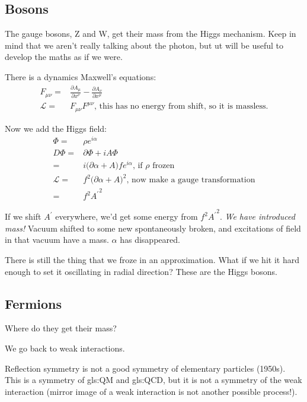\documentclass[]{article}
\begin{document}
\subsection{Bosons}

The gauge bosons, Z and W, get their mass from the Higgs mechanism. Keep in mind that we aren't really talking about the photon, but ut will be useful to develop the maths as if we were.

There is a dynamics Maxwell's equations:
\begin{align*}
	F_{\mu\nu}=&\frac{\partial A_\mu}{\partial x^\nu}-\frac{\partial A_\nu}{\partial x^\mu}\\
	\mathcal{L} =& F_{\mu\nu} F^{\mu\nu} \text{, this has no energy from shift, so it is massless.}
\end{align*}

Now we add the Higgs field:
\begin{align*}
	\Phi =& \rho e^{i \alpha}\\
	D \Phi =& \partial \Phi + i A \Phi\\
	=& i \big( \partial \alpha + A \big) f e^{i \alpha} \text{, if $\rho$ frozen}\\
	\mathcal{L} =& f^2 \big(\partial \alpha + A \big)^2 \text{, now make a gauge transformation}\\
	=& f^2 {A^\prime}^2
\end{align*}

If we shift $A^\prime$ everywhere, we'd get some energy from $f^2 {A^\prime}^2$. \emph{We have introduced mass!} Vacuum shifted to some new spontaneously broken, and excitations of field in that vacuum have a mass. $\alpha$ has disappeared.

There is still the thing that we froze in an approximation. What if we hit it hard enough to set it oscillating in radial direction? These are the Higgs bosons.
 
\subsection{Fermions}

Where do they get their mass?

We go back to weak interactions.

Reflection symmetry is not a good symmetry of elementary particles (1950s). This is a symmetry of \gls{gls:QM} and \gls{gls:QCD}, but it is not a symmetry of the weak interaction (mirror image of a weak interaction is not another possible process!). 
\end{document}
